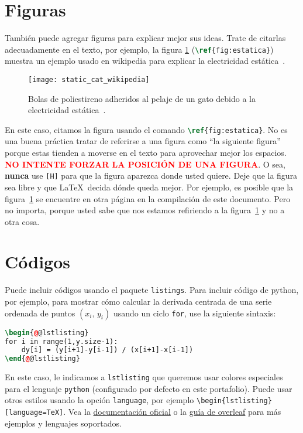 \documentclass[../portafolio.tex]{subfiles}
\begin{document}
\section{Figuras} \label{sec:figuras}
También puede agregar figuras para explicar mejor sus ideas. Trate de
citarlas adecuadamente en el texto, por ejemplo, la figura
\ref{fig:estatica} (\lstinline[language=TeX]!\ref{fig:estatica}!) muestra un ejemplo usado en wikipedia
para explicar la electricidad estática~\citep{wikistatic}.
\begin{figure}[ht!]
  \centering
  \texttt{[image: static\_cat\_wikipedia]}
  \caption{Bolas de poliestireno adheridos al pelaje de un gato debido
    a la electricidad estática~\citep{wikistatic}.}
  \label{fig:estatica}
\end{figure}

En este caso, citamos la figura usando el comando \lstinline[language=TeX]!\ref{fig:estatica}!. No es una buena práctica tratar de referirse a una figura como ``la siguiente figura'' porque estas tienden a moverse en el texto para aprovechar mejor los espacios. \textcolor{red}{\bf NO INTENTE FORZAR LA POSICIÓN DE UNA FIGURA}. O sea, \textbf{nunca} use \lstinline[language=TeX]![H]! para que la figura aparezca donde usted quiere. Deje que la figura sea libre y que \LaTeX\ decida dónde queda mejor. Por ejemplo, es posible que la figura~\ref{fig:estatica} se encuentre en otra página en la compilación de este documento. Pero no importa, porque usted sabe que nos estamos refiriendo a la figura~\ref{fig:estatica} y no a otra cosa.


\section{Códigos}
Puede incluir códigos usando el paquete
\lstinline[language=TeX]!listings!. Para incluir código de python, por
ejemplo, para mostrar cómo calcular la derivada centrada de una serie
ordenada de puntos $(x_i,\,y_i)$ usando un ciclo
\lstinline[language=TeX]!for!, use la siguiente sintaxis:
\begin{lstlisting}[language=TeX,escapechar=@]
\begin{@@lstlisting}
for i in range(1,y.size-1):
    dy[i] = (y[i+1]-y[i-1]) / (x[i+1]-x[i-1])
\end{@@lstlisting}
\end{lstlisting}

En este caso, le indicamos a \lstinline!lstlisting! que queremos usar colores especiales para el lenguaje \lstinline!python! (configurado por defecto en este portafolio). Puede usar otros estilos usando la opción \lstinline!language!, por ejemplo \lstinline!\begin{lstlisting}[language=TeX]!. Vea la \href{https://ctan.org/pkg/listings}{documentación oficial} o la \href{https://www.overleaf.com/learn/latex/Code_listing}{guía de overleaf} para más ejemplos y lenguajes soportados.
\end{document}
